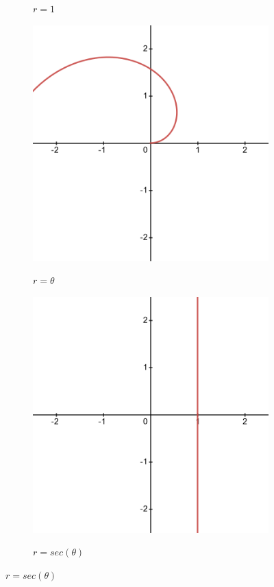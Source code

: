 \documentclass[11pt]{article}
\begin{document}
\begin{flushleft}
\begin{figure}[h]
\begin{subfigure}[b]{0.3\textwidth}
	\label{fig:i}
	\caption{$r=1$}
	\end{subfigure}
	\hfill
	\begin{subfigure}[b]{0.3\textwidth}
	\centering
	\includegraphics[width=\textwidth]{requalstheta.png}
	\label{fig:ii}
	\caption{$r=\theta$}
	\end{subfigure}
	\hfill
	\begin{subfigure}[b]{0.3\textwidth}
	\centering
	\includegraphics[width=\textwidth]{requalssecanttheta.png}
	\label{fig:iii}
	\caption{$r=sec(\theta)$}
	\end{subfigure}
	

\end{figure}
\end{flushleft}
\end{document}
